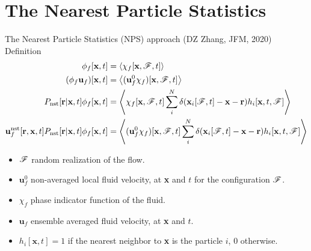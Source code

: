 \documentclass{sintefbeamer}
\begin{document}
\section{The Nearest Particle Statistics}

\begin{frame}{The Nearest Particle Statistics (NPS) approach (DZ Zhang, JFM, 2020) Definition}
  \begin{align*}
    \phi_f[\textbf{x},t] &= \left<\chi_f[\textbf{x},\mathscr{F},t]\right>\\
    (\phi_f \textbf{u}_f)[\textbf{x},t] &= \left<(\textbf{u}_f^0\chi_f)[\textbf{x},\mathscr{F},t]\right>\\
    P_\text{nst}[\textbf{r}|\textbf{x},t]\phi_f[\textbf{x},t] &= \left<\chi_f[\textbf{x},\mathscr{F},t]\sum_i^N \delta(\textbf{x}_i[\mathscr{F},t] - \textbf{x} - \textbf{r}) h_i[\textbf{x},t,\mathscr{F}]\right>\\
    \textbf{u}_f^\text{nst}[\textbf{r},\textbf{x},t] P_\text{nst}[\textbf{r}|\textbf{x},t]\phi_f[\textbf{x},t] &= \left<(\textbf{u}_f^0\chi_f)[\textbf{x},\mathscr{F},t]\sum_i^N \delta(\textbf{x}_i[\mathscr{F},t] - \textbf{x} - \textbf{r}) h_i[\textbf{x},t,\mathscr{F}]\right>
  \end{align*}
  \begin{itemize}
    \item $\mathscr{F}$ random realization of the flow. 
    \item $\textbf{u}_f^0$ non-averaged local fluid velocity, at \textbf{x} and $t$ for the configuration $\mathscr{F}$.
    \item $\chi_f$ phase indicator function of the fluid.
    \item $\textbf{u}_f$ ensemble averaged fluid velocity, at \textbf{x} and $t$.
    \item $h_i[\textbf{x},t] = 1$ if the nearest neighbor to \textbf{x} is the particle $i$, 0 otherwise.  
  \end{itemize}
\end{frame}
\end{document}
